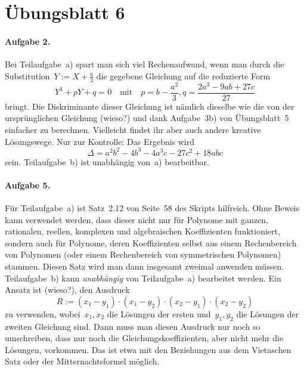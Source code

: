 \documentclass{../algblatt}
\begin{document}
\section*{Übungsblatt 6}

\paragraph{Aufgabe 2.} Bei Teilaufgabe~a) spart man sich viel Rechenaufwand,
wenn man durch die Substitution~$Y := X + \frac{a}{3}$ die gegebene Gleichung
auf die reduzierte Form
\[ Y^3 + pY + q = 0 \quad\text{mit}\quad
  p = b - \frac{a^2}{3}, q = \frac{2a^3 - 9ab + 27c}{27} \]
bringt. Die Diskriminante dieser Gleichung ist nämlich dieselbe wie die von der
ursprünglichen Gleichung (wieso?) und dank Aufgabe~3b) von Übungsblatt~5
einfacher zu berechnen. Vielleicht findet ihr aber auch andere kreative
Lösungswege. Nur zur Kontrolle: Das Ergebnis wird
\[ \Delta = a^2b^2 - 4b^3 - 4a^3c - 27c^2 + 18abc \]
sein. Teilaufgabe~b) ist unabhängig von~a) bearbeitbar.

\paragraph{Aufgabe 5.} Für Teilaufgabe~a) ist Satz~2.12 von Seite~58 des
Skripts hilfreich. Ohne Beweis kann verwendet werden, dass dieser nicht nur für
Polynome mit ganzen, rationalen, reellen, komplexen und algebraischen
Koeffizienten funktioniert, sondern auch für Polynome, deren Koeffizienten
selbst aus einem Rechenbereich von Polynomen (oder einem Rechenbereich von
symmetrischen Polynomen) stammen. Diesen Satz wird man dann insgesamt zweimal
anwenden müssen. Teilaufgabe~b) kann \emph{unabhängig} von Teilaufgabe~a)
bearbeitet werden. Ein Ansatz ist (wieso?), den Ausdruck
\[ R := (x_1 - y_1) \cdot (x_1 - y_2) \cdot (x_2 - y_1) \cdot (x_2 - y_2) \]
zu verwenden, wobei~$x_1,x_2$ die Lösungen der ersten und~$y_1,y_2$ die
Lösungen der zweiten Gleichung sind. Dann muss man diesen Ausdruck nur noch so
umschreiben, dass nur noch die Gleichungskoeffizienten, aber nicht mehr die
Lösungen, vorkommen. Das ist etwa mit den Beziehungen aus dem Vietaschen Satz
oder der Mitternachtsformel möglich.
\end{document}
